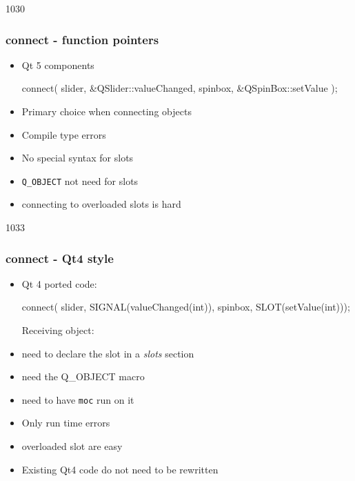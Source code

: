 \newcommand{\advantage}{\hspace{-5mm}\makebox[6mm]{\correct}}
\newcommand{\disadvantage}{\hspace{-5mm}\makebox[6mm]{\incorrect}}
\begin{slide}[fragile]{1030}\frametitle{connect - function pointers}
  \begin{itemize}
\item Qt 5 components
\begin{cpp}
connect( slider, &QSlider::valueChanged,
         spinbox, &QSpinBox::setValue );
\end{cpp}\medskip
\item Primary choice when connecting objects\medskip
\item[]\advantage Compile type errors
\item[]\advantage No special syntax for slots
\item[]\advantage \texttt{Q\_OBJECT} not need for slots
\item[]\disadvantage connecting to overloaded slots is hard
  \end{itemize}
\end{slide}


\begin{slide}[fragile]{1033}\frametitle{connect - Qt4 style}
  \begin{itemize}
  \item Qt 4 ported code:\\
\begin{cpp}
connect( slider, SIGNAL(valueChanged(int)),
         spinbox, SLOT(setValue(int)));
\end{cpp}\medskip
\hspace{-3mm}Receiving object:
\item[]\disadvantage need to declare the slot in a \textit{slots}
  section
\item[]\disadvantage need the Q\_OBJECT macro
\item[]\disadvantage need to have \texttt{moc} run on it\bigskip

\item[]\disadvantage Only run time errors
\item[]\advantage overloaded slot are easy
\item[]\advantage Existing Qt4 code do not need to be rewritten
\end{itemize}
\bigskip\bigskip
\end{slide}


